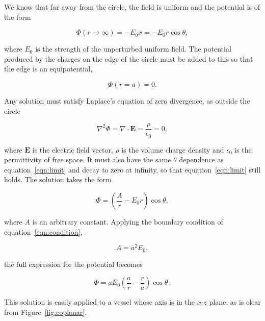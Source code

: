   We know that far away from the circle, the field is uniform and the potential is of the form
  
  \begin{equation}
    \Phi(r\rightarrow\infty) = -E_0x = -E_0r\cos\theta,
    \label{eqn:limit}
  \end{equation}
  
  where $E_0$ is the strength of the unperturbed uniform field. The potential produced by the charges on the edge of the circle must be added to this so that the edge is an equipotential,
  
  \begin{equation}
    \Phi(r=a) = 0.
    \label{eqn:condition}
  \end{equation}
  
  Any solution must satisfy Laplace’s equation of zero divergence, as outside the circle
  
  \begin{equation}
    \nabla^2\Phi = \nabla\cdot\mathbf{E} = \frac{\rho}{\epsilon_0} = 0,
  \end{equation}
  
  where $\mathbf{E}$ is the electric field vector, $\rho$ is the volume charge density and $\epsilon_0$ is the permittivity of free space. It must also have the same $\theta$ dependence as equation~\ref{eqn:limit} and decay to zero at infinity, so that equation~\ref{eqn:limit} still holds. The solution takes the form
  
  \begin{equation}
    \Phi = \left(\frac{A}{r} - E_0r\right)\cos\theta,
  \end{equation}
  
  where $A$ is an arbitrary constant. Applying the boundary condition of equation~\ref{eqn:condition},
  
  \begin{equation}
    A = a^2E_0,
  \end{equation}
  
  the full expression for the potential becomes
  
  \begin{equation}
    \Phi = aE_0\left(\frac{a}{r} - \frac{r}{a} \right)\cos\theta\, .
    \label{eqn:potential}
  \end{equation}
  
  This solution is easily applied to a vessel whose axis is in the $x$-$z$ plane, as is clear from Figure~\ref{fig:coplanar}.
  
